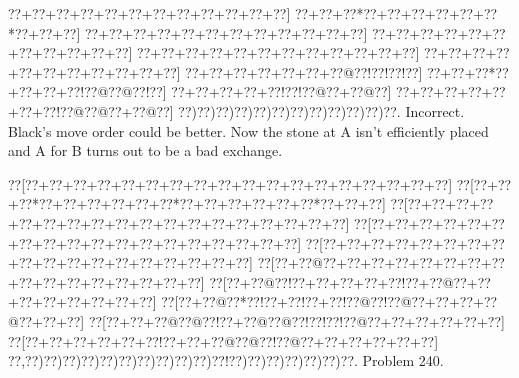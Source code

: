 \documentclass[a5paper]{article}
\begin{document}
\begin{center}
{\goo
\0??+\0??+\0??+\0??+\0??+\0??+\0??+\0??+\0??+\0??+\0??+\0??]
\0??+\0??+\0??*\0??+\0??+\0??+\0??+\0??+\0??*\0??+\0??+\0??]
\0??+\0??+\0??+\0??+\0??+\0??+\0??+\0??+\0??+\0??+\0??+\0??]
\0??+\0??+\0??+\0??+\0??+\0??+\0??+\0??+\0??+\0??+\0??]
\0??+\0??+\0??+\0??+\0??+\0??+\0??+\0??+\0??+\0??+\0??+\0??]
\0??+\0??+\0??+\0??+\0??+\0??+\0??+\0??+\0??+\0??+\0??]
\0??+\0??+\0??+\0??+\0??+\0??+\0??@\0??!\0??!\0??!\0??]
\0??+\0??+\0??*\0??+\0??+\0??+\0??!\0??@\0??@\0??!\0??]
\0??+\0??+\0??+\0??+\0??!\0??!\0??@\0??+\0??@\0??]
\0??+\0??+\0??+\0??+\0??+\0??+\0??!\0??@\0??@\0??+\0??@\0??]
\0??)\0??)\0??)\0??)\0??)\0??)\0??)\0??)\0??)\0??)\0??)\0??.
}
Incorrect. Black's move order could be better. Now the stone at A isn't efficiently placed and A for B turns out to be a bad exchange.

\end{center}
\newpage
\begin{center}
{\goo
\0??[\0??+\0??+\0??+\0??+\0??+\0??+\0??+\0??+\0??+\0??+\0??+\0??+\0??+\0??+\0??+\0??+\0??+\0??]
\0??[\0??+\0??+\0??*\0??+\0??+\0??+\0??+\0??+\0??*\0??+\0??+\0??+\0??+\0??+\0??*\0??+\0??+\0??]
\0??[\0??+\0??+\0??+\0??+\0??+\0??+\0??+\0??+\0??+\0??+\0??+\0??+\0??+\0??+\0??+\0??+\0??+\0??]
\0??[\0??+\0??+\0??+\0??+\0??+\0??+\0??+\0??+\0??+\0??+\0??+\0??+\0??+\0??+\0??+\0??+\0??+\0??]
\0??[\0??+\0??+\0??+\0??+\0??+\0??+\0??+\0??+\0??+\0??+\0??+\0??+\0??+\0??+\0??+\0??+\0??+\0??]
\0??[\0??+\0??@\0??+\0??+\0??+\0??+\0??+\0??+\0??+\0??+\0??+\0??+\0??+\0??+\0??+\0??+\0??+\0??]
\0??[\0??+\0??@\0??!\0??+\0??+\0??+\0??+\0??!\0??+\0??@\0??+\0??+\0??+\0??+\0??+\0??+\0??+\0??]
\0??[\0??+\0??@\0??*\0??!\0??+\0??!\0??+\0??!\0??@\0??!\0??@\0??+\0??+\0??+\0??@\0??+\0??+\0??]
\0??[\0??+\0??+\0??@\0??@\0??!\0??+\0??@\0??@\0??!\0??!\0??!\0??@\0??+\0??+\0??+\0??+\0??+\0??]
\0??[\0??+\0??+\0??+\0??+\0??+\0??!\0??+\0??+\0??@\0??@\0??!\0??@\0??+\0??+\0??+\0??+\0??+\0??]
\0??,\0??)\0??)\0??)\0??)\0??)\0??)\0??)\0??)\0??)\0??)\0??!\0??)\0??)\0??)\0??)\0??)\0??)\0??.
}
Problem 240.

\end{center}
\end{document}

